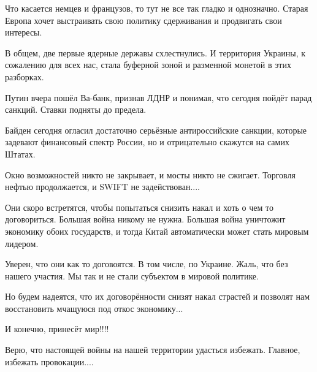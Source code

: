 Что касается немцев и французов, то тут не все так гладко и однозначно. Старая
Европа хочет выстраивать свою политику сдерживания и продвигать свои  интересы. 

В общем, две первые ядерные державы схлестнулись. И территория Украины, к
сожалению для всех нас, стала буферной зоной и разменной монетой в этих
разборках. 

Путин вчера пошёл Ва-банк, признав ЛДНР и понимая, что сегодня пойдёт парад
санкций. Ставки подняты до предела. 

Байден сегодня огласил достаточно серьёзные антироссийские санкции, которые
задевают финансовый спектр России, но и отрицательно скажутся на самих Штатах. 

Окно возможностей никто не закрывает, и мосты никто не сжигает. Торговля нефтью
продолжается, и SWIFT не задействован....

Они скоро встретятся, чтобы попытаться снизить накал и хоть о чем то
договориться. Большая война никому не нужна. Большая война уничтожит экономику
обоих государств, и тогда Китай автоматически может стать мировым лидером. 

Уверен, что они как то договоятся. В том числе, по Украине. Жаль, что без
нашего участия. Мы так и не стали субъектом в мировой политике. 

Но будем надеятся, что их договорённости снизят накал страстей и позволят нам
восстановить мчащуюся под откос экономику... 

И конечно, принесёт мир!!!! 

Верю, что настоящей войны на нашей территории удасться избежать. Главное,
избежать провокации....
